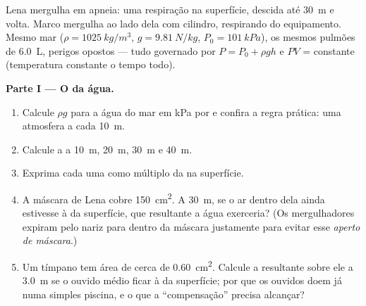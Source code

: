 \begin{problem}
\label{pb:g10:pressure:1}
Lena mergulha em apneia: uma respiração na superfície, descida até
\qty{30}{m} e volta. Marco mergulha ao lado dela com cilindro,
respirando do equipamento. Mesmo mar ($\rho = \qty{1025}{kg/m^3}$,
$g = \qty{9.81}{N/kg}$, $P_0 = \qty{101}{kPa}$), os mesmos pulmões de
\qty{6.0}{L}, perigos opostos --- tudo governado por
$P = P_0 + \rho g h$ e $PV$ = constante (temperatura constante o tempo
todo).

\medskip
\noindent\textbf{Parte I --- O  da água.}
\begin{enumerate}
  \item Calcule $\rho g$ para a água do mar em \unit{kPa} por  e
        confira a regra prática: uma atmosfera a cada \qty{10}{m}.
  \item Calcule a  a \qty{10}{m}, \qty{20}{m},
        \qty{30}{m} e \qty{40}{m}.
  \item Exprima cada uma como múltiplo da  na superfície.
  \item A máscara de Lena cobre \qty{150}{cm^2}. A \qty{30}{m}, se o ar
        dentro dela ainda estivesse à  da superfície, que 
        resultante a água exerceria? (Os mergulhadores expiram pelo nariz
        para dentro da máscara justamente para evitar esse \emph{aperto
        de máscara}.)
  \item Um tímpano tem área de cerca de \qty{0.60}{cm^2}. Calcule a 
        resultante sobre ele a \qty{3.0}{m} se o ouvido médio ficar à
         da superfície; por que os ouvidos doem já numa simples
        piscina, e o que a ``compensação'' precisa alcançar?
\end{enumerate}


\end{problem}
